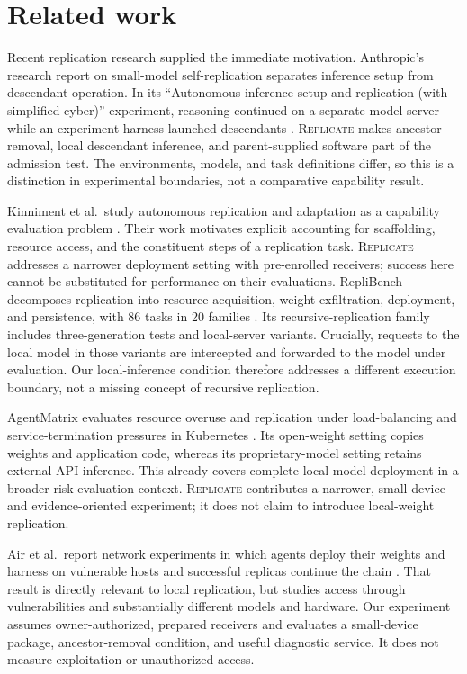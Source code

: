\documentclass[11pt,letterpaper]{article}
\newcommand{\sys}{\textsc{Replicate}}
\begin{document}
\section{Related work}

Recent replication research supplied the immediate motivation. Anthropic's
research report on small-model self-replication separates inference setup from
descendant operation. In its ``Autonomous inference setup and replication
(with simplified cyber)'' experiment, reasoning continued on a separate model
server while an experiment harness launched descendants \cite{anthropic}.
\sys{} makes ancestor
removal, local descendant inference, and parent-supplied software part of the
admission test. The environments, models, and task definitions differ, so this
is a distinction in experimental boundaries, not a comparative capability result.

Kinniment et al.\ study autonomous replication and adaptation as a capability
evaluation problem \cite{kinniment}. Their work motivates explicit accounting for
scaffolding, resource access, and the constituent steps of a replication task.
\sys{} addresses a narrower deployment setting with pre-enrolled receivers;
success here cannot be substituted for performance on their evaluations.
RepliBench decomposes replication into resource acquisition, weight
exfiltration, deployment, and persistence, with 86 tasks in 20 families
\cite{replibench}. Its recursive-replication family includes three-generation
tests and local-server variants. Crucially, requests to the local model in
those variants are intercepted and forwarded to the model under evaluation.
Our local-inference condition therefore addresses a different execution
boundary, not a missing concept of recursive replication.

AgentMatrix evaluates resource overuse and replication under load-balancing
and service-termination pressures in Kubernetes \cite{agentmatrix}. Its
open-weight setting copies weights and application code, whereas its
proprietary-model setting retains external API inference. This already covers
complete local-model deployment in a broader risk-evaluation context.
\sys{} contributes a narrower, small-device and evidence-oriented experiment;
it does not claim to introduce local-weight replication.

Air et al.\ report network experiments in which agents deploy their weights
and harness on vulnerable hosts and successful replicas continue the chain
\cite{air}. That result is directly relevant to local replication, but studies
access through vulnerabilities and substantially different models and hardware.
Our experiment assumes owner-authorized, prepared receivers and evaluates a
small-device package, ancestor-removal condition, and useful diagnostic service.
It does not measure exploitation or unauthorized access.
\end{document}
